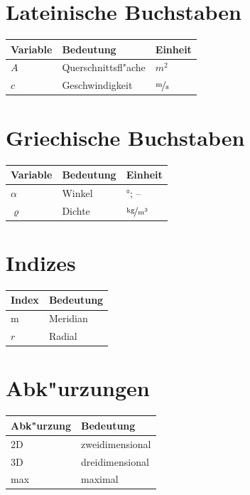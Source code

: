 \documentclass[bachelor,       %
               twoside,        %
               BCOR10mm,       %
               english,ngerman, %
               ]{GAUBM}
\newcommand{\tabheadfont}[1]{\textbf{#1}} %
\begin{document}
\begin{nomenclature}
\section*{Lateinische Buchstaben}
\noindent
\begin{longtable}[l]{p{}p{}p{}}
  \tabheadfont{Variable}&\tabheadfont{Bedeutung}&\tabheadfont{Einheit}\\\midrule\endhead
  $A$ & Querschnittsfl"ache & $\unit{m^2}$\\
  $c$ & Geschwindigkeit & $\unitfrac{m}{s}$
\end{longtable}
\section*{Griechische Buchstaben}
\begin{longtable}[l]{p{}p{}p{}}
  \tabheadfont{Variable}&\tabheadfont{Bedeutung}&\tabheadfont{Einheit}\\\midrule\endhead
  $\alpha$  & Winkel & $\unit{\degree}$; --\\
  $\varrho$ & Dichte & $\unitfrac{kg}{m^3}$
\end{longtable}
\section*{Indizes}
\begin{longtable}[l]{p{}p{}}
  \tabheadfont{Index}&\tabheadfont{Bedeutung}\\\midrule\endhead
  m & Meridian\\
  $r$ & Radial
\end{longtable}
\section*{Abk"urzungen}
\begin{longtable}[l]{p{}p{}}
  \tabheadfont{Abk"urzung}&\tabheadfont{Bedeutung}\\\midrule\endhead
  2D & zweidimensional\\
  3D & dreidimensional\\
  max & maximal
\end{longtable}
\end{nomenclature}
\end{document}
